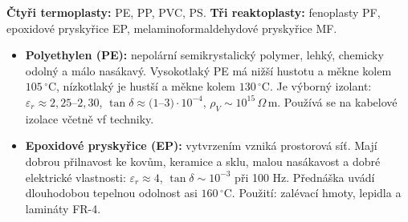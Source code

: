 \textbf{Čtyři termoplasty:} PE, PP, PVC, PS. \textbf{Tři reaktoplasty:} fenoplasty PF, epoxidové pryskyřice EP, melaminoformaldehydové pryskyřice MF.
\begin{itemize}
\item \textbf{Polyethylen (PE):} nepolární semikrystalický polymer, lehký, chemicky odolný a málo nasákavý. Vysokotlaký PE má nižší hustotu a měkne kolem $105\,^{\circ}\mathrm C$, nízkotlaký je hustší a měkne kolem $130\,^{\circ}\mathrm C$. Je výborný izolant: $\varepsilon_r\approx2{,}25$--$2{,}30$, $\tan\delta\approx(1$--$3)\cdot10^{-4}$, $\rho_V\sim10^{15}\,\Omega\,\mathrm m$. Používá se na kabelové izolace včetně vf techniky.
\item \textbf{Epoxidové pryskyřice (EP):} vytvrzením vzniká prostorová síť. Mají dobrou přilnavost ke kovům, keramice a sklu, malou nasákavost a dobré elektrické vlastnosti: $\varepsilon_r\approx4$, $\tan\delta\sim10^{-3}$ při 100 Hz. Přednáška uvádí dlouhodobou tepelnou odolnost asi $160\,^{\circ}\mathrm C$. Použití: zalévací hmoty, lepidla a lamináty FR-4.
\end{itemize}
